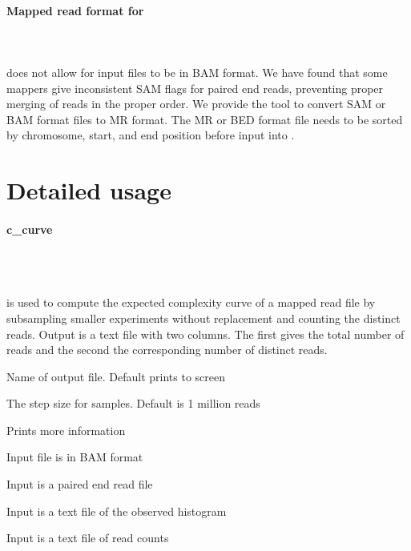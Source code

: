 \documentclass[11pt, titlepage]{article}
\begin{document}
\paragraph{Mapped read format for }~\\~\\[-.2cm]


 does not allow for input files to be in BAM format.
We have found that some mappers give inconsistent SAM flags
for paired end reads, preventing proper merging of reads in the proper
order.  
We provide the tool 
to convert SAM or BAM format files to MR format.  The MR
or BED format file needs to be sorted by chromosome, start, and
end position before input into .


\newpage

\section{Detailed usage}
\label{chap:detail}

\paragraph{c\_curve}~\\~\\[-.2cm]
\label{sec:complexityplot}

 is used to compute the 
expected complexity curve of a mapped read file by 
subsampling smaller experiments without replacement 
and counting the distinct reads.
Output is a text file with two 
columns.  The first gives the total number
of reads and the second the corresponding number
of distinct reads.

\begin{description}[style=multiline,leftmargin=6cm,font=\ttfamily]
\item[\begingroup \fontsize{9pt}{12pt}\selectfont-o, -output\endgroup] Name of output file. Default prints to screen
\item[\begingroup \fontsize{9pt}{12pt}\selectfont-s, -step\endgroup] The step size for samples. Default is 1 million reads
\item[\begingroup \fontsize{9pt}{12pt}\selectfont-v -verbose\endgroup] Prints more information
\item[\begingroup \fontsize{9pt}{12pt}\selectfont-B, -bam\endgroup] Input file is in BAM format
\item[\begingroup \fontsize{9pt}{12pt}\selectfont-P, -pe\endgroup] Input is a paired end read file
\item[\begingroup \fontsize{9pt}{12pt}\selectfont-H, -hist\endgroup] Input is a text file of the observed histogram
\item[\begingroup \fontsize{9pt}{12pt}\selectfont-V, -vals\endgroup] Input is a text file of read counts
\end{description}
\end{document}
